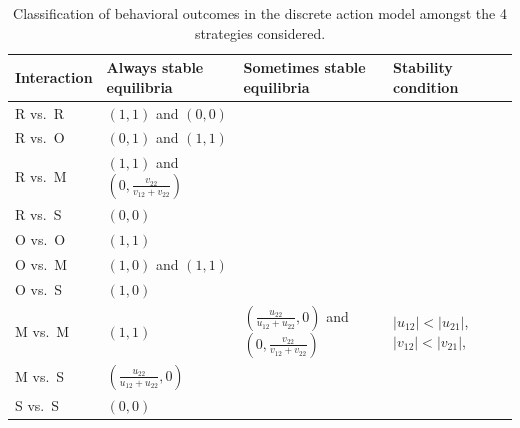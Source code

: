 \documentclass[11pt,reqno]{amsart}
\begin{document}
\begin{table}[htbp]
\small
\caption{Classification of behavioral outcomes in the discrete action model amongst the 4 strategies considered.}
\label{behOut}
\begin{tabular}{@{}llll@{}}
\toprule
    \textbf{Interaction}    & \textbf{Always stable equilibria}                       & \textbf{Sometimes stable equilibria}                                               & \textbf{Stability condition}                           \\ \midrule
R vs.~R & $(1,1)$ and $(0,0)$                                               &                                                                           &                                               \\ \midrule
R vs.~O & $(0,1)$ and $(1,1)$                            &                                                                           &                                               \\ \midrule
R vs.~M & $(1,1)$ and $(0,\frac{v_{22}}{v_{12}+v_{22}})$ &                                                                           &                                               \\ \midrule
R vs.~S & $(0,0)$                                        &                                                                           &                                               \\ \midrule
O vs.~O & $(1,1)$                                        &                                                                           &                                               \\ \midrule
O vs.~M & $(1,0)$ and $(1,1)$                            &                                                                           &                                               \\ \midrule
O vs.~S & $(1,0)$                                        &                                                                           &                                               \\ \midrule
M vs.~M & $(1,1)$                                        & $(\frac{u_{22}}{u_{12}+u_{22}},0)$ and $(0,\frac{v_{22}}{v_{12}+v_{22}})$ & $|u_{12}| < |u_{21}|$, $|v_{12}| < |v_{21}|$, \\ \midrule
M vs.~S & $(\frac{u_{22}}{u_{12}+u_{22}},0)$             &                                                                           &                                               \\ \midrule
S vs.~S & $(0,0)$                                        &                                                                           &                                               \\ \bottomrule
\end{tabular}
\end{table}
\end{document}

